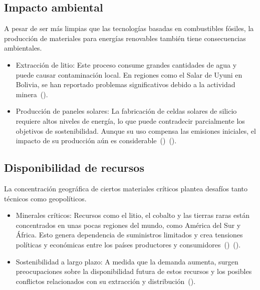 \documentclass[letterpaper, 12pt]{article}
\begin{document}
\subsection*{Impacto ambiental}

A pesar de ser más limpias que las tecnologías basadas en combustibles fósiles,
la producción de materiales para energías renovables también tiene
consecuencias ambientales.

\begin{itemize}
      \item Extracción de litio: Este proceso consume grandes cantidades de agua y puede
            causar contaminación local. En regiones como el Salar de Uyuni en Bolivia, se
            han reportado problemas significativos debido a la actividad
            minera~(\cite{Leanez2022}).

      \item Producción de paneles solares: La fabricación de celdas solares de silicio
            requiere altos niveles de energía, lo que puede contradecir parcialmente los
            objetivos de sostenibilidad. Aunque su uso compensa las emisiones iniciales, el
            impacto de su producción aún es
            considerable~(\cite{Saleh_Hassan2024})~(\cite{Yhaya2018}).
\end{itemize}

\subsection*{Disponibilidad de recursos}

La concentración geográfica de ciertos materiales críticos plantea desafíos
tanto técnicos como geopolíticos.

\begin{itemize}
      \item Minerales críticos: Recursos como el litio, el cobalto y las tierras raras
            están concentrados en unas pocas regiones del mundo, como América del Sur y
            África. Esto genera dependencia de suministros limitados y crea tensiones
            políticas y económicas entre los países productores y
            consumidores~(\cite{Leader_Gaustad2019a})~(\cite{Robinson2023}).

      \item Sostenibilidad a largo plazo: A medida que la demanda aumenta, surgen
            preocupaciones sobre la disponibilidad futura de estos recursos y los posibles
            conflictos relacionados con su extracción y
            distribución~(\cite{Henriksson2021}).
\end{itemize}
\end{document}

